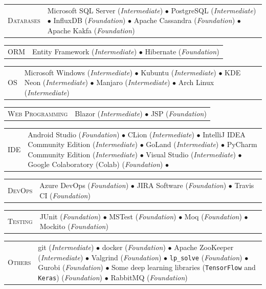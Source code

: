 \documentclass[english,10pt,a4paper]{article}
\newcommand{\BasicLevel}{{\footnotesize (\textit{Foundation})}}
\newcommand{\MediumLevel}{{\footnotesize (\textit{Intermediate})}}
\newcommand{\CvBullet}{\hspace{0.05cm} $\bullet$ \hspace{0.05cm}}
\newcommand{\CvDate}[1]{\textcolor{CvColor}{{\textsc{#1}}}}
\def\SidebarHSize{3.5cm}
\def\BodyHSize{11cm}
\begin{document}
	\begin{longtable}{p{\SidebarHSize}p{\BodyHSize}}
		\CvDate{Databases} & Microsoft SQL Server \MediumLevel \CvBullet PostgreSQL \MediumLevel \CvBullet InfluxDB \BasicLevel \CvBullet Apache Cassandra \BasicLevel \CvBullet Apache Kakfa \BasicLevel \\
	\end{longtable}
	
	\begin{longtable}{p{\SidebarHSize}p{\BodyHSize}}
		\CvDate{ORM} & Entity Framework \MediumLevel \CvBullet Hibernate \BasicLevel
	\end{longtable}
	
	\begin{longtable}{p{\SidebarHSize}p{\BodyHSize}}
		\CvDate{OS} & Microsoft Windows \MediumLevel \CvBullet Kubuntu \MediumLevel \CvBullet KDE Neon \MediumLevel \CvBullet Manjaro \MediumLevel \CvBullet Arch Linux \MediumLevel \\
	\end{longtable}
	
	\begin{longtable}{p{\SidebarHSize}p{\BodyHSize}}
		\CvDate{Web Programming} & Blazor \MediumLevel \CvBullet JSP \BasicLevel \\
	\end{longtable}
	
	\begin{longtable}{p{\SidebarHSize}p{\BodyHSize}}
		\CvDate{IDE} & Android Studio \BasicLevel \CvBullet CLion \MediumLevel \CvBullet IntelliJ IDEA Community Edition \MediumLevel \CvBullet GoLand \MediumLevel \CvBullet PyCharm Community Edition \MediumLevel \CvBullet Visual Studio \MediumLevel \CvBullet Google Colaboratory (Colab) \BasicLevel \CvBullet \\
	\end{longtable}
	
	\begin{longtable}{p{\SidebarHSize}p{\BodyHSize}}
		\CvDate{DevOps} & Azure DevOps \BasicLevel \CvBullet JIRA Software \BasicLevel \CvBullet Travis CI \BasicLevel \\
	\end{longtable}
	
	\begin{longtable}{p{\SidebarHSize}p{\BodyHSize}}
		\CvDate{Testing} & JUnit \BasicLevel \CvBullet MSTest \BasicLevel \CvBullet Moq \BasicLevel \CvBullet Mockito \BasicLevel
	\end{longtable}
	
	\begin{longtable}{p{\SidebarHSize}p{\BodyHSize}}
		\CvDate{Others} & git \MediumLevel \CvBullet docker \BasicLevel \CvBullet Apache ZooKeeper \MediumLevel \CvBullet Valgrind \BasicLevel \CvBullet \texttt{lp\_solve} \BasicLevel \CvBullet  Gurobi \BasicLevel \CvBullet Some deep learning libraries (\texttt{TensorFlow} and \texttt{Keras}) \BasicLevel \CvBullet RabbitMQ \BasicLevel \\
	\end{longtable}
	
\end{document}
